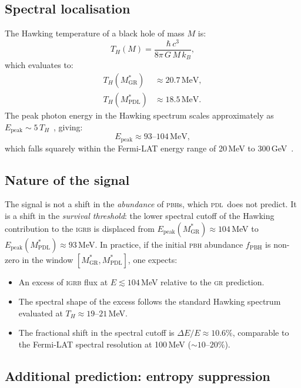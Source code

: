 \documentclass[12pt, a4paper]{article}
\theoremstyle{definition}
\newcommand{\PDL}{\textsc{pdl}}
\newcommand{\MstarGR}{M^{*}_{\mathrm{GR}}}
\newcommand{\MstarPDL}{M^{*}_{\mathrm{PDL}}}
\begin{document}
\subsection{Spectral localisation}

The Hawking temperature of a black hole of mass $M$ is:
\begin{equation}
  T_H(M) = \frac{\hbar\,c^3}{8\pi\,G\,M\,k_B},
\end{equation}
which evaluates to:
\begin{align}
  T_H(\MstarGR)  &\approx 20.7\,\mathrm{MeV}, \\
  T_H(\MstarPDL) &\approx 18.5\,\mathrm{MeV}.
\end{align}
The peak photon energy in the Hawking spectrum scales approximately as $E_{\mathrm{peak}} \sim 5\,T_H$~\cite{MacGibbon1991}, giving:
\begin{equation}
  E_{\mathrm{peak}} \approx 93\text{--}104\,\mathrm{MeV},
\end{equation}
which falls squarely within the Fermi-LAT energy range of 20\,MeV to 300\,GeV~\cite{Atwood2009}.

\subsection{Nature of the signal}

The signal is not a shift in the \emph{abundance} of \textsc{pbh}s, which \PDL\ does not predict. It is a shift in the \emph{survival threshold}: the lower spectral cutoff of the Hawking contribution to the \textsc{igrb} is displaced from $E_{\mathrm{peak}}(\MstarGR) \approx 104$\,MeV to $E_{\mathrm{peak}}(\MstarPDL) \approx 93$\,MeV. In practice, if the initial \textsc{pbh} abundance $f_{\mathrm{PBH}}$ is non-zero in the window $[\MstarGR, \MstarPDL]$, one expects:
\begin{itemize}
  \item An excess of \textsc{igrb} flux at $E \lesssim 104$\,MeV relative to the \textsc{gr} prediction.
  \item The spectral shape of the excess follows the standard Hawking spectrum~\cite{MacGibbon1990} evaluated at $T_H \approx 19$--$21$\,MeV.
  \item The fractional shift in the spectral cutoff is $\Delta E/E \approx 10.6\%$, comparable to the Fermi-LAT spectral resolution at 100\,MeV ($\sim 10$--$20\%$).
\end{itemize}

\subsection{Additional prediction: entropy suppression}
\end{document}
